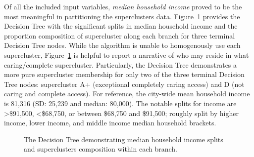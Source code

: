 \documentclass[
  authoryear,
  preprint,
  3p]{elsarticle}
\begin{document}
Of all the included input variables, \emph{median household income}
proved to be the most meaningful in partitioning the superclusters data.
Figure~\ref{fig-Fig9} provides the Decision Tree with the significant
splits in median household income and the proportion composition of
supercluster along each branch for three terminal Decision Tree nodes.
While the algorithm is unable to homogenously use each supercluster,
Figure~\ref{fig-Fig9} is helpful to report a narrative of who may reside
in what caring/complete supercluster. Particularly, the Decision Tree
demonstrates a more pure supercluster membership for only two of the
three terminal Decision Tree nodes: supercluster A+ (exceptional
completely caring access) and D (not caring and complete access). For
reference, the city-wide mean household income is 81,316 (SD: 25,239 and
median: 80,000). The notable splits for income are \textgreater\$91,500,
\textless\$68,750, or between \$68,750 and \$91,500; roughly split by
higher income, lower income, and middle income median household
brackets.

\begin{figure}


\caption{\label{fig-Fig9}The Decision Tree demonstrating median
household income splits and superclusters composition within each
branch.}

\end{figure}%
\end{document}

